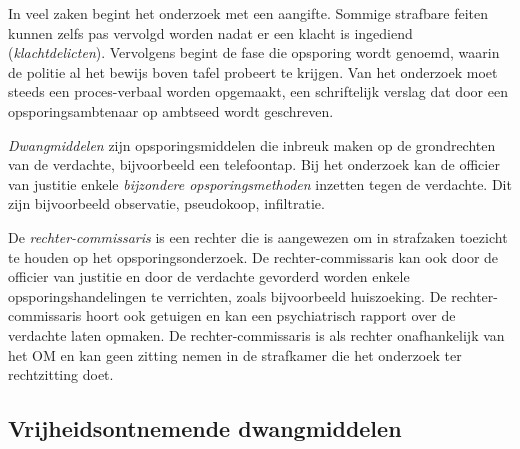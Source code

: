 \documentclass{article}
\begin{document}
In veel zaken begint het onderzoek met een aangifte. Sommige strafbare feiten
kunnen zelfs pas vervolgd worden nadat er een klacht is ingediend
(\emph{klachtdelicten}). Vervolgens begint de fase die opsporing wordt genoemd,
waarin de politie al het bewijs boven tafel probeert te krijgen. Van het
onderzoek moet steeds een proces-verbaal worden opgemaakt, een schriftelijk
verslag dat door een opsporingsambtenaar op ambtseed wordt geschreven.

\emph{Dwangmiddelen} zijn opsporingsmiddelen die inbreuk maken op de
grondrechten van de verdachte, bijvoorbeeld een telefoontap. Bij het onderzoek
kan de officier van justitie enkele \emph{bijzondere opsporingsmethoden}
inzetten tegen de verdachte. Dit zijn bijvoorbeeld observatie, pseudokoop,
infiltratie.

De \emph{rechter-commissaris} is een rechter die is aangewezen om in strafzaken
toezicht te houden op het opsporingsonderzoek. De rechter-commissaris kan ook
door de officier van justitie en door de verdachte gevorderd worden enkele
opsporingshandelingen te verrichten, zoals bijvoorbeeld huiszoeking. De
rechter-commissaris hoort ook getuigen en kan een psychiatrisch rapport over de
verdachte laten opmaken. De rechter-commissaris is als rechter onafhankelijk
van het OM en kan geen zitting nemen in de strafkamer die het onderzoek ter
rechtzitting doet.

\subsection{Vrijheidsontnemende dwangmiddelen}
\end{document}
